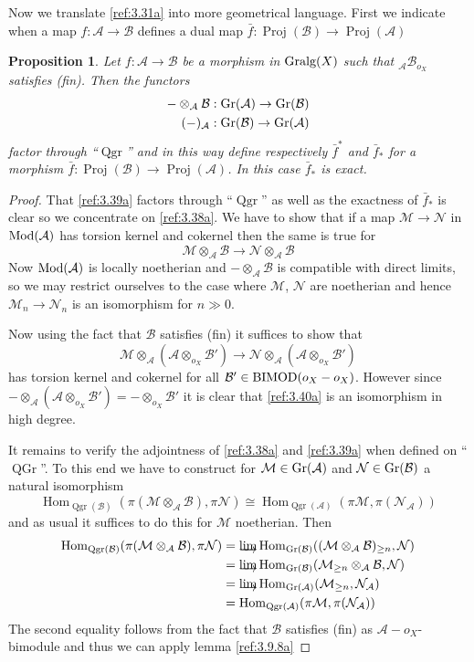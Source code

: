 \documentclass{amsproc}
\def\Ascr{{\mathcal A}}
\def\Bscr{{\mathcal B}}
\def\Mscr{{\mathcal M}}
\def\Nscr{{\mathcal N}}
\def\Mod{\mathop{\text{Mod}}}
\def\BIMOD{\mathop{\text{BIMOD}}}
\def\Gr{\mathop{\text{Gr}}}
\def\Gralg{\mathop{\text{Gralg}}}
\def\Hom{\operatorname {Hom}}
\def\Proj{\operatorname {Proj}}
\def\Qgr{\operatorname {Qgr}}
\def\r{\rightarrow}
\let\oldtext\text
\def\text#1{\oldtext{\upshape #1}}
\DeclareMathOperator{\QGr}{QGr}
\newtheorem{propositions}[lemmas]{Proposition}
\theoremstyle{definition}
\theoremstyle{remark}
\def\dirlim{\mathop{\vtop{\baselineskip -100pt\lineskip -1pt\lineskiplimit 0pt
\setbox0\hbox{\upshape lim}\copy0\hbox to \wd0{\rightarrowfill}}}\limits}
\numberwithin{equation}{section}
\numberwithin{table}{section}
\numberwithin{figure}{section}
\def\Gr{\mathop{\text{Gr}}}
\begin{document}
Now we translate \eqref{ref:3.31a} into more geometrical language. First we
indicate when a map $f:\Ascr\r \Bscr$ defines a dual map
$\bar{f}:\Proj(\Bscr)\r \Proj(\Ascr)$
\begin{propositions}
\label{ref:3.9.11a}
Let $f:\Ascr\r \Bscr$ be a morphism in $\Gralg(X)$ such that
${}_\Ascr\Bscr_{o_X}$ satisfies (fin). Then the functors
\begin{align}
\label{ref:3.38a}
-\otimes_\Ascr\Bscr&:\Gr(\Ascr)\r \Gr(\Bscr)\\
(-)_\Ascr&:\Gr(\Bscr)\r \Gr(\Ascr) \label{ref:3.39a}
\end{align}
factor through ``$\Qgr$'' and in this way define respectively $\bar{f}^\ast$
and $\bar{f}_\ast$ for a morphism $\bar{f}:\Proj(\Bscr)\r \Proj
(\Ascr)$. In this case $\bar{f}_\ast$ is exact.
\end{propositions}
\begin{proof}
That \eqref{ref:3.39a} factors through ``$\Qgr$'' as well as the
exactness of $\bar{f}_\ast$ is clear so we
concentrate on \eqref{ref:3.38a}. We have to show that if a map $\Mscr\r
\Nscr$ in $\Mod(\Ascr)$ has torsion kernel and cokernel then the same is
true for 
\[
\Mscr\otimes_\Ascr\Bscr\r\Nscr\otimes_\Ascr\Bscr
\]
Now $\Mod(\Ascr)$ is locally noetherian and $-\otimes_\Ascr\Bscr$ is
compatible with direct limits, so we may restrict ourselves to the case where
$\Mscr$, $\Nscr$ are noetherian and hence $\Mscr_n\r\Nscr_n$ is an
isomorphism for $n\gg 0$.

Now using the fact that $\Bscr$ satisfies (fin) it suffices to show that
\begin{equation}
\label{ref:3.40a}
\Mscr\otimes_\Ascr (\Ascr\otimes_{o_X}\Bscr')
\r
\Nscr\otimes_\Ascr (\Ascr\otimes_{o_X}\Bscr')
\end{equation}
has torsion kernel and cokernel for all $\Bscr'\in \BIMOD(o_X-o_X)$.
However since $-\otimes_\Ascr(\Ascr\otimes_{o_X}\Bscr')=-\otimes_{o_X}\Bscr'$ it is
clear that \eqref{ref:3.40a} is an isomorphism in high degree. 

It remains to verify the adjointness of \eqref{ref:3.38a} and
\eqref{ref:3.39a} when defined on ``$\QGr$''. To this end we have to
construct for $\Mscr\in\Gr(\Ascr)$ and $\Nscr\in \Gr(\Bscr)$ a natural
isomorphism 
\[
\Hom_{\Qgr(\Bscr)}(\pi(\Mscr\otimes_\Ascr\Bscr),\pi\Nscr)
\cong
\Hom_{\Qgr(\Ascr)}(\pi\Mscr,\pi(\Nscr_\Ascr))
\]
and as usual it  suffices to do this for  $\Mscr$ noetherian. Then
\begin{align*}
\Hom_{\Qgr(\Bscr)}(\pi(\Mscr\otimes_\Ascr\Bscr),\pi\Nscr)
&=\dirlim \Hom_{\Gr(\Bscr)}((\Mscr\otimes_\Ascr \Bscr)_{\ge n},\Nscr)\\
&=\dirlim \Hom_{\Gr(\Bscr)}(\Mscr_{\ge n}\otimes_\Ascr \Bscr,\Nscr)\\
&=\dirlim \Hom_{\Gr(\Ascr)}(\Mscr_{\ge n},\Nscr_\Ascr)\\
&=\Hom_{\Qgr(\Ascr)}(\pi\Mscr,\pi(\Nscr_\Ascr))
\end{align*}
The second equality follows from the fact that $\Bscr$ satisfies (fin) as
$\Ascr-o_X$-bimodule and thus we can apply lemma \ref{ref:3.9.8a}
\end{proof}
\end{document}
